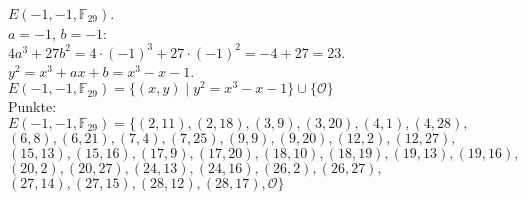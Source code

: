 \documentclass[a4paper, 10pt]{scrartcl}
\begin{document}
$E(-1, -1, \mathbb{F}_{29})$.\\

$a = -1$, $b = -1$:\\
$4a^{3} + 27b^{2} = 4\cdot (-1)^{3} + 27\cdot (-1)^{2} = -4 + 27 = 23.$\\
$y^{2} = x^{3} + ax + b = x^{3} - x - 1$.\\

$E(-1, -1, \mathbb{F}_{29}) = \{ (x, y)\mid y^{2} = x^{3} - x - 1\}\cup \{ \mathcal{O} \}$\\

Punkte:\\
$
E(-1, -1, \mathbb{F}_{29}) = \{
(2, 11),
(2, 18),
(3, 9),
(3, 20),
(4, 1),
(4, 28),
$\\
$
(6, 8),
(6, 21),
(7, 4),
(7, 25),
(9, 9),
(9, 20),
(12, 2),
(12, 27),
$\\
$
(15, 13),
(15, 16),
(17, 9),
(17, 20),
(18, 10),
(18, 19),
(19, 13),
(19, 16),
$\\
$
(20, 2),
(20, 27),
(24, 13),
(24, 16),
(26, 2),
(26, 27),
$\\
$
(27, 14),
(27, 15),
(28, 12),
(28, 17),
\mathcal{O} \}
$\\
\end{document}
